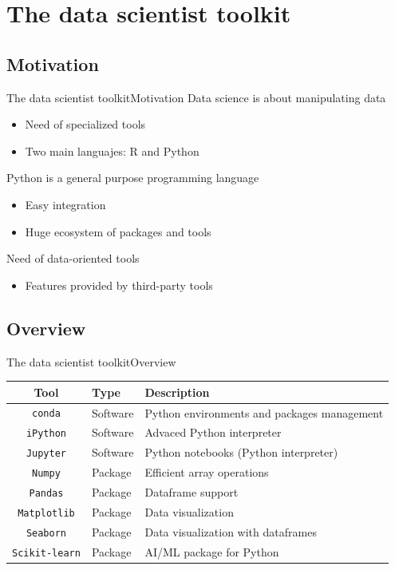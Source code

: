 \documentclass[10pt,compress]{beamer} %
\begin{document}
\section{The data scientist toolkit}

\subsection{Motivation}

\begin{frame}{The data scientist toolkit}{Motivation}
	Data science is about manipulating data
	\begin{itemize}
		\item Need of specialized tools
		\item Two main languajes: R and Python
	\end{itemize}
	Python is a general purpose programming language
	\begin{itemize}
		\item Easy integration 
		\item Huge ecosystem of packages and tools
	\end{itemize}
	Need of data-oriented tools
	\begin{itemize}
		\item Features provided by third-party tools
	\end{itemize}
\end{frame}

\subsection{Overview}

\begin{frame}{The data scientist toolkit}{Overview}
   \begin{tabular}{cll}\hline
       \textbf{Tool}& \textbf{Type} & \textbf{Description}\\ \hline
	   \texttt{conda} 	& Software & Python environments and packages management \\
	   \texttt{iPython} & Software & Advaced Python interpreter \\
	   \texttt{Jupyter} & Software & Python notebooks (Python interpreter) \\
	   \texttt{Numpy}   & Package  & Efficient array operations \\
	   \texttt{Pandas}  & Package  & Dataframe support \\
	   \texttt{Matplotlib} & Package & Data visualization \\
	   \texttt{Seaborn} & Package & Data visualization with dataframes \\
	   \texttt{Scikit-learn} & Package & AI/ML package for Python \\
	   \hline
   \end{tabular}
\end{frame}
\end{document}

